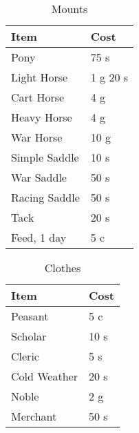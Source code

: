 \documentclass[a4paper,11pt,oneside]{book}
\begin{document}
\begin{table}[ht]
	\centering
	\caption{Mounts}
	\begin{tabular}{|l|l|}
		\hline
		Item & Cost\\ [0.5ex]
		\hline
		Pony & 75 s\\
		Light Horse & 1 g 20 s\\
		Cart Horse & 4 g\\
		Heavy Horse & 4 g\\
		War Horse & 10 g\\
		\hline
		Simple Saddle & 10 s\\
		War Saddle & 50 s\\
		Racing Saddle & 50 s\\
		Tack & 20 s\\
		Feed, 1 day & 5 c\\
		\hline
	\end{tabular}
\end{table}

\begin{table}[ht]
	\centering
	\caption{Clothes}
	\begin{tabular}{|l|l|}
		\hline
		Item & Cost\\ [0.5ex]
		\hline
		Peasant & 5 c\\
		Scholar & 10 s\\
		Cleric & 5 s\\
		Cold Weather & 20 s\\
		Noble & 2 g\\
		Merchant & 50 s\\
		\hline
	\end{tabular}
\end{table}





\listoftables
\end{document}
